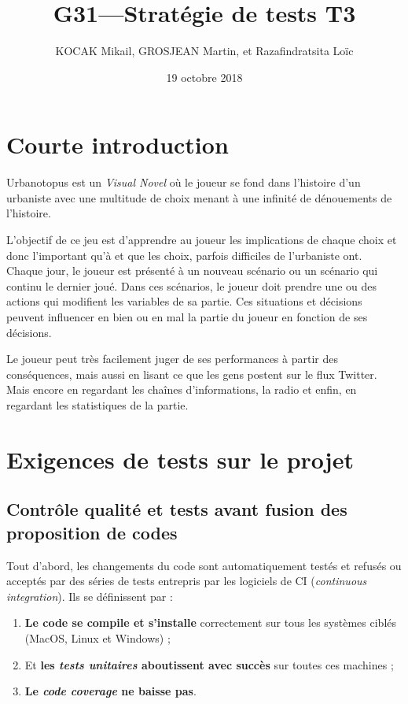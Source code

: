 \documentclass[final]{article}
\title{G31---Stratégie de tests T3}
\author{KOCAK Mikail, GROSJEAN Martin, et Razafindratsita Loïc}
\date{19 octobre 2018}
\begin{document}
  \maketitle
  
  \tableofcontents
  
  \section{Courte introduction}
    Urbanotopus est un \emph{Visual Novel} où le joueur se fond dans l'histoire 
    d'un urbaniste avec une multitude de choix menant 
    à une infinité de dénouements de l'histoire.

    L'objectif de ce jeu est d'apprendre au joueur les implications de chaque choix 
    et donc l'important qu'à et que les choix, parfois difficiles de l'urbaniste ont.\\
    
    Chaque jour, le joueur est présenté à un nouveau scénario ou 
    un scénario qui continu le dernier joué. 
    Dans ces scénarios, le joueur doit prendre une ou des actions 
    qui modifient les variables de sa partie.
    Ces situations et décisions peuvent influencer en bien ou en mal
    la partie du joueur en fonction de ses décisions.

    Le joueur peut très facilement juger de ses performances à partir des conséquences, 
    mais aussi en lisant ce que les gens postent sur le flux Twitter. 
    Mais encore en regardant les chaînes d'informations, la radio et enfin, 
    en regardant les statistiques de la partie.
  
  \section{Exigences de tests sur le projet}
    \subsection{
        Contrôle qualité et tests avant fusion des proposition de codes}      
      \indent Tout d'abord, les changements du code 
      sont automatiquement testés et refusés ou acceptés par 
      des séries de tests entrepris par les logiciels de CI 
      (\emph{continuous integration}). Ils se définissent par :

      \begin{enumerate}
        \item \textbf{Le code se compile et s'installe} correctement sur 
        tous les systèmes ciblés (MacOS, Linux et Windows) ;
        \item Et \textbf{les \emph{tests unitaires} aboutissent avec succès}
        sur toutes ces machines ;
        \item \textbf{Le \emph{code coverage} ne baisse pas}.
      \end{enumerate}
      
\end{document}

